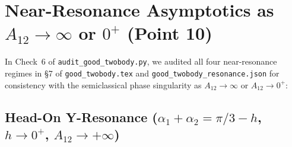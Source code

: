 \documentclass[11pt,a4paper]{article}
\begin{document}
\section{Near-Resonance Asymptotics as $A_{12} \to \infty$ or $0^+$ (Point 10)}

In Check~6 of \texttt{audit\_good\_twobody.py}, we audited all four near-resonance regimes in \S7 of \texttt{good\_twobody.tex} and \texttt{good\_twobody\_resonance.json} for consistency with the semiclassical phase singularity as $A_{12} \to \infty$ or $A_{12} \to 0^+$:

\subsection{Head-On Y-Resonance ($\alpha_1 + \alpha_2 = \pi/3 - h$, $h \to 0^+$, $A_{12} \to +\infty$)}
\end{document}
